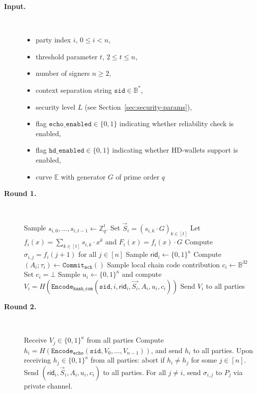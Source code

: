 \documentclass[11pt]{article}
\newcommand{\sid}{\ensuremath{\mathtt{sid}}}
\newcommand{\var}[1]{\ensuremath{\mathtt{#1}}}
\newcommand{\commit}[1]{\ensuremath{\mathtt{Commit}_{\mathtt{#1}}}}
\newcommand{\Encode}[1][]{\ensuremath{\mathtt{Encode}_{\mathtt{#1}}}}
\newcommand{\rid}{\textsf{rid}}
\newcommand{\E}{\mathbb{E}}
\newcommand{\Z}{\mathbb{Z}}
\newcommand{\?}[1]{\stackrel{?}{#1}}
\newcommand{\Bit}{\ensuremath{\{0{,}1\}}}
\newcommand{\Byte}{\ensuremath{\mathbb{B}}}
\begin{document}
\begin{description}
    \item[\bf Input.] \
    \begin{itemize}[noitemsep,topsep=0pt]
    \item party index $i$, $0 \le i < n$,
    \item threshold parameter $t$, $2 \le t \le n$,
    \item number of signers $n \ge 2$,
    \item context separation string $\sid \in \Byte^*$,
    \item security level $L$ (see Section~\ref{sec:security-params}),
    \item flag $\var{echo\_enabled} \in \Bit$ indicating whether reliability check is enabled,
    \item flag $\var{hd\_enabled} \in \Bit$ indicating whether HD-wallets support is enabled,
    \item curve $\E$ with generator $G$ of prime order $q$
    \end{itemize}

    \item[\textbf{Round 1.}] \
    \begin{algorithmic}[1]
        \State Sample $s_{i,0}, \ldots, s_{i,{t-1}} \gets \Z_q^t$. 
        \State Set $\vec S_i = (s_{i,k} \cdot G)_{k \in [t]}$
        \State Let $f_i(x) = \sum_{k \in [t]} s_{i,k} \cdot x^k$ and $F_i(x) = f_i(x) \cdot G$
        \State Compute $\sigma_{i,j} = f_i(j + 1)$ for all $j \in [n]$
        \State Sample $\rid_i \gets \Bit^\kappa$
        \State Compute $(A_i; \tau_i) \gets \commit{sch}()$
        \If{$\var{hd\_wallets}$} 
            \State Sample local chain code contribution $c_i \gets \Byte^{32}$
        \Else
            \State Set $c_i = \bot$
        \EndIf
        \State Sample $u_i \gets \Bit^\kappa$
               and compute $V_i = H(\Encode[hash\_com](\sid, i, \rid_i, \vec{S_i}, A_i, u_i, c_i))$
        \State Send $V_i$ to all parties
    \end{algorithmic}


    \item[\textbf{Round 2.}] \
    \begin{algorithmic}[1]
        \State Receive $V_j \in \Bit^\kappa$ from all parties
        \If{$\var{echo\_enabled}$} 
            \State Compute $h_i = H(\Encode[echo](\sid, V_0, \dots, V_{n-1}))$, and send $h_i$ to all parties.
            \State Upon receiving $h_j \in \Bit^\kappa$ from all  parties: abort if 
                   $h_i \neq h_j$ for some $j \in [n]$.
        \EndIf
        \State Send $(\rid_i, \vec{S}_i, A_i, u_i, c_i)$ to all parties.
        \State For all $j \neq i$, send $\sigma_{i,j}$ to $P_j$ via private channel.
    \end{algorithmic}


\end{description}
\end{document}
